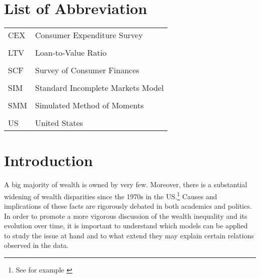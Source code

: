 \documentclass[a4paper,12pt,legno]{article}
\begin{document}
 \newpage
\thispagestyle{empty}
\listoffigures

 \newpage
 
	\thispagestyle{empty}
	\section*{List of Abbreviation}
	
	\begin{table}[!htbp]
		\centering
	\begin{flushleft}  
	   \begin{tabular}{ll}
	    CEX	  & Consumer Expenditure Survey \\ \\
	    LTV   & Loan-to-Value Ratio \\ \\
	    SCF	  & Survey of Consumer Finances \\ \\
	    SIM   & Standard Incomplete Markets Model \\ \\
	    SMM   & Simulated Method of Moments \\ \\
	    US	  & United States
	    \end{tabular}%
	\end{flushleft}
	\end{table}%
	\newpage



\setcounter{page}{1}        %


\section{Introduction}
\label{Introduction}

A big majority of wealth is owned by very few. Moreover, there is a substantial widening of wealth disparities since the 1970s in the US.\footnote{See for example \citet{kuhn2017income}} Causes and implications of these facts are rigorously debated in both academics and politics. In order to promote a more vigorous discussion of the wealth inequality and its evolution over time, it is important to understand which models can be applied to study the issue at hand and to what extend they may explain certain relations observed in the data.\\
\end{document}
